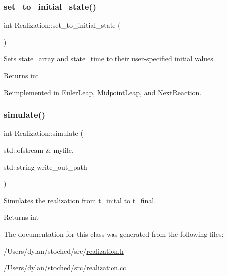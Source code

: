 \subsubsection{\texorpdfstring{set\+\_\+to\+\_\+initial\+\_\+state()}{set\_to\_initial\_state()}}
{\footnotesize\ttfamily int Realization\+::set\+\_\+to\+\_\+initial\+\_\+state (\begin{DoxyParamCaption}{ }\end{DoxyParamCaption})\hspace{0.3cm}{\ttfamily [virtual]}}



Sets state\+\_\+array and state\+\_\+time to their user-\/specified initial values. 

\begin{DoxyReturn}{Returns}
int 
\end{DoxyReturn}


Reimplemented in \hyperlink{class_euler_leap_a1a13929ea1ebf40e7357439968828f4b}{Euler\+Leap}, \hyperlink{class_midpoint_leap_a177682cf5042407ccee1a443e8920896}{Midpoint\+Leap}, and \hyperlink{class_next_reaction_a0cc63c4ec9fe3f338472fff302f6d746}{Next\+Reaction}.

\mbox{\label{class_realization_a72c7179b0a27d84aa30bace768a05e99}} 
\subsubsection{\texorpdfstring{simulate()}{simulate()}}
{\footnotesize\ttfamily int Realization\+::simulate (\begin{DoxyParamCaption}\item[{std\+::ofstream \&}]{myfile,  }\item[{std\+::string}]{write\+\_\+out\+\_\+path }\end{DoxyParamCaption})}



Simulates the realization from t\+\_\+inital to t\+\_\+final. 

\begin{DoxyReturn}{Returns}
int 
\end{DoxyReturn}


The documentation for this class was generated from the following files\+:\begin{DoxyCompactItemize}
\item 
/\+Users/dylan/stoched/src/\hyperlink{realization_8h}{realization.\+h}\item 
/\+Users/dylan/stoched/src/\hyperlink{realization_8cc}{realization.\+cc}\end{DoxyCompactItemize}
